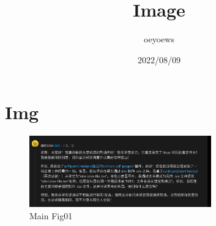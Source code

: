 \documentclass{article}
\title{Image}
\author{oeyoews}
\date{2022/08/09}
\begin{document}
\maketitle

\newpage

\section{Img}
\label{sec:img}

\begin{figure}[H]
\centering
\includegraphics[width=0.7\textwidth]{img/01.png}
\caption{Main Fig01 }
\label{Fig 00}
\end{figure}
\end{document}
